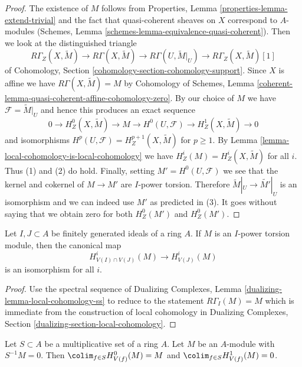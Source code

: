 \begin{proof}
The existence of $M$ follows from
Properties, Lemma \ref{properties-lemma-extend-trivial}
and the fact that quasi-coherent sheaves on $X$ correspond
to $A$-modules (Schemes, Lemma \ref{schemes-lemma-equivalence-quasi-coherent}).
Then we look at the distinguished triangle
$$
R\Gamma_Z(X, \widetilde{M}) \to R\Gamma(X, \widetilde{M}) \to
R\Gamma(U, \widetilde{M}|_U) \to R\Gamma_Z(X, \widetilde{M})[1]
$$
of Cohomology, Section \ref{cohomology-section-cohomology-support}.
Since $X$ is affine we have $R\Gamma(X, \widetilde{M}) = M$
by Cohomology of Schemes, Lemma
\ref{coherent-lemma-quasi-coherent-affine-cohomology-zero}.
By our choice of $M$ we have $\mathcal{F} = \widetilde{M}|_U$
and hence this produces an exact sequence
$$
0 \to H^0_Z(X, \widetilde{M}) \to M \to H^0(U, \mathcal{F}) \to
H^1_Z(X, \widetilde{M}) \to 0
$$
and isomorphisms $H^p(U, \mathcal{F}) = H^{p + 1}_Z(X, \widetilde{M})$
for $p \geq 1$. By Lemma \ref{lemma-local-cohomology-is-local-cohomology}
we have $H^i_Z(M) = H^i_Z(X, \widetilde{M})$ for all $i$.
Thus (1) and (2) do hold.
Finally, setting $M' = H^0(U, \mathcal{F})$ we see that
the kernel and cokernel of $M \to M'$ are $I$-power torsion.
Therefore $\widetilde{M}|_U \to \widetilde{M'}|_U$ is an isomorphism
and we can indeed use $M'$ as predicted in (3). It goes without saying
that we obtain zero for both $H^0_Z(M')$ and $H^0_Z(M')$.
\end{proof}

\begin{lemma}
\label{lemma-already-torsion}
Let $I, J \subset A$ be finitely generated ideals of a ring $A$.
If $M$ is an $I$-power torsion module, then the
canonical map
$$
H^i_{V(I) \cap V(J)}(M) \to H^i_{V(J)}(M)
$$
is an isomorphism for all $i$.
\end{lemma}

\begin{proof}
Use the spectral sequence of
Dualizing Complexes, Lemma \ref{dualizing-lemma-local-cohomology-ss}
to reduce to the statement $R\Gamma_I(M) = M$ which is immediate
from the construction of local cohomology
in Dualizing Complexes, Section \ref{dualizing-section-local-cohomology}.
\end{proof}

\begin{lemma}
\label{lemma-multiplicative}
Let $S \subset A$ be a multiplicative set of a ring $A$.
Let $M$ be an $A$-module with $S^{-1}M = 0$. Then
$\colim_{f \in S} H^0_{V(f)}(M) = M$ and
$\colim_{f \in S} H^1_{V(f)}(M) = 0$.
\end{lemma}

